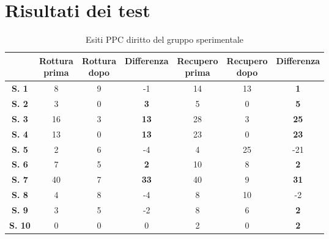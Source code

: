\chapter{Risultati dei test}

\begin{table}[H]
\begin{center}
\begin{tabular}{|c|c|c|c|c|c|c|} \hline
{\textbf{}} & \pbox{20cm}{\textbf{Rottura} \\ \textbf{prima}} & \pbox{20cm}{\textbf{Rottura} \\ \textbf{dopo}} & \textbf{Differenza} & \pbox{20cm}{\textbf{Recupero} \\ \textbf{prima}} & \pbox{20cm}{\textbf{Recupero} \\ \textbf{dopo}} & \textbf{Differenza} \\ \hline
\textbf{S. 1} & 8 & 9 & -1 & 14 & 13 & \textbf{1} \\ \hline
\textbf{S. 2} & 3 & 0 & \textbf{3} & 5 & 0 & \textbf{5} \\ \hline
\textbf{S. 3} & 16 & 3 & \textbf{13} & 28 & 3 & \textbf{25}  \\ \hline
\textbf{S. 4} & 13 & 0 & \textbf{13} & 23 & 0 & \textbf{23}  \\ \hline
\textbf{S. 5} & 2 & 6 & -4 & 4 & 25 & -21  \\ \hline
\textbf{S. 6} & 7 & 5 & \textbf{2} & 10 & 8 & \textbf{2} \\ \hline
\textbf{S. 7} & 40 & 7 & \textbf{33} & 40 & 9 & \textbf{31} \\ \hline
\textbf{S. 8} & 4 & 8 & -4 & 8 & 10 & -2  \\ \hline
\textbf{S. 9} & 3 & 5 & -2 & 8 & 6 & \textbf{2} \\ \hline
\textbf{S. 10} & 0 & 0 & 0 & 2 & 0 & \textbf{2} \\ \hline

\end{tabular}
\end{center}
\caption{Esiti PPC diritto del gruppo sperimentale}
\end{table}
\\\ \\\ \\\ \\\ \\\ \\\ \\\ \\\ \\\ \\\ \\\ \\\ \\\ \\\

